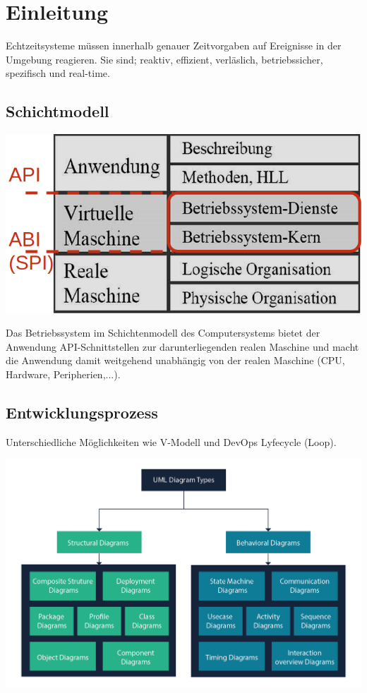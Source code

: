 \section{Einleitung}

Echtzeitsysteme müssen innerhalb genauer Zeitvorgaben auf Ereignisse in der Umgebung reagieren.
Sie sind; reaktiv, effizient, verläslich, betriebssicher, spezifisch und real-time.

\subsection{Schichtmodell}

\begin{center}
	\includegraphics[width=.6\linewidth]{"Images/Schichtmodell.png"}
\end{center}

Das Betriebssystem im Schichtenmodell des Computersystems bietet der Anwendung API-Schnittstellen zur darunterliegenden realen Maschine und macht die Anwendung damit weitgehend unabhängig von der realen Maschine (CPU, Hardware, Peripherien,...).

\subsection{Entwicklungsprozess}

Unterschiedliche Möglichkeiten wie V-Modell und DevOps Lyfecycle (Loop).

\includegraphics[width=\linewidth]{"Images/UML-Diagram-types-1.png"}

